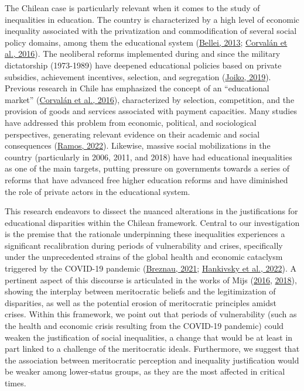 \documentclass[
  12pt,
  a4paper,
]{article}
\begin{document}
The Chilean case is particularly relevant when it comes to the study of
inequalities in education. The country is characterized by a high level
of economic inequality associated with the privatization and
commodification of several social policy domains, among them the
educational system (\protect\hyperlink{ref-bellei_estudio_2013}{Bellei,
2013};
\protect\hyperlink{ref-corvalanMercadoEscolarLibertad2016}{Corvalán et
al., 2016}). The neoliberal reforms implemented during and since the
military dictatorship (1973-1989) have deepened educational policies
based on private subsidies, achievement incentives, selection, and
segregation (\protect\hyperlink{ref-joiko_cuasimercado_2019}{Joiko,
2019}). Previous research in Chile has emphasized the concept of an
``educational market''
(\protect\hyperlink{ref-corvalanMercadoEscolarLibertad2016}{Corvalán et
al., 2016}), characterized by selection, competition, and the provision
of goods and services associated with payment capacities. Many studies
have addressed this problem from economic, political, and sociological
perspectives, generating relevant evidence on their academic and social
consequences (\protect\hyperlink{ref-ramos_educacion_2022}{Ramos,
2022}). Likewise, massive social mobilizations in the country
(particularly in 2006, 2011, and 2018) have had educational inequalities
as one of the main targets, putting pressure on governments towards a
series of reforms that have advanced free higher education reforms and
have diminished the role of private actors in the educational system.

This research endeavors to dissect the nuanced alterations in the
justifications for educational disparities within the Chilean framework.
Central to our investigation is the premise that the rationale
underpinning these inequalities experiences a significant recalibration
during periods of vulnerability and crises, specifically under the
unprecedented strains of the global health and economic cataclysm
triggered by the COVID-19 pandemic
(\protect\hyperlink{ref-breznau_welfare_2021}{Breznau, 2021};
\protect\hyperlink{ref-hankivsky_introduction_2022}{Hankivsky et al.,
2022}). A pertinent aspect of this discourse is articulated in the works
of Mijs (\protect\hyperlink{ref-mijs_stratified_2016}{2016},
\protect\hyperlink{ref-mijs_visualizing_2018}{2018}), showing the
interplay between meritocratic beliefs and the legitimization of
disparities, as well as the potential erosion of meritocratic principles
amidst crises. Within this framework, we point out that periods of
vulnerability (such as the health and economic crisis resulting from the
COVID-19 pandemic) could weaken the justification of social
inequalities, a change that would be at least in part linked to a
challenge of the meritocratic ideals. Furthermore, we suggest that the
association between meritocratic perception and inequality justification
would be weaker among lower-status groups, as they are the most affected
in critical times.
\end{document}
